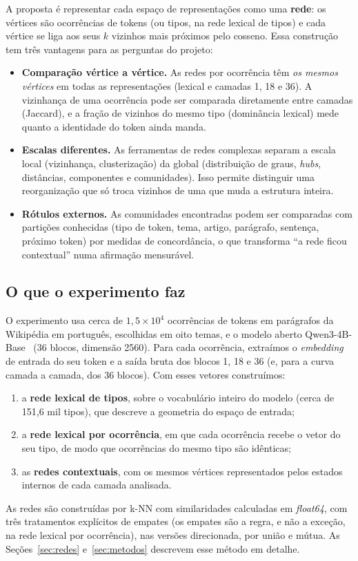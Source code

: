 A proposta é representar cada espaço de representações como uma \textbf{rede}: os vértices são
ocorrências de tokens (ou tipos, na rede lexical de tipos) e cada vértice se liga aos seus $k$
vizinhos mais próximos pelo cosseno. Essa construção tem três vantagens para as perguntas do
projeto:
\begin{itemize}
    \item \textbf{Comparação vértice a vértice.} As redes por ocorrência têm \emph{os mesmos
    vértices} em todas as representações (lexical e camadas 1, 18 e 36). A vizinhança de uma
    ocorrência pode ser comparada diretamente entre camadas (Jaccard), e a fração de vizinhos do
    mesmo tipo (dominância lexical) mede quanto a identidade do token ainda manda.
    \item \textbf{Escalas diferentes.} As ferramentas de redes complexas separam a escala local
    (vizinhança, clusterização) da global (distribuição de graus, \emph{hubs}, distâncias,
    componentes e comunidades). Isso permite distinguir uma reorganização que só troca vizinhos
    de uma que muda a estrutura inteira.
    \item \textbf{Rótulos externos.} As comunidades encontradas podem ser comparadas com
    partições conhecidas (tipo de token, tema, artigo, parágrafo, sentença, próximo token) por
    medidas de concordância, o que transforma ``a rede ficou contextual'' numa afirmação
    mensurável.
\end{itemize}

\subsection{O que o experimento faz}

O experimento usa cerca de $1{,}5\times10^4$ ocorrências de tokens em parágrafos da Wikipédia em
português, escolhidas em oito temas, e o modelo aberto Qwen3-4B-Base~\cite{qwen3} (36 blocos,
dimensão 2560). Para cada ocorrência, extraímos o \emph{embedding} de entrada do seu token e
a saída bruta dos blocos 1, 18 e 36 (e, para a curva camada a camada, dos 36 blocos). Com
esses vetores construímos:
\begin{enumerate}
    \item a \textbf{rede lexical de tipos}, sobre o vocabulário inteiro do modelo (cerca de
    151,6 mil tipos), que descreve a geometria do espaço de entrada;
    \item a \textbf{rede lexical por ocorrência}, em que cada ocorrência recebe o vetor do seu
    tipo, de modo que ocorrências do mesmo tipo são idênticas;
    \item as \textbf{redes contextuais}, com os mesmos vértices representados pelos estados
    internos de cada camada analisada.
\end{enumerate}
As redes são construídas por k-NN com similaridades calculadas em \emph{float64}, com três
tratamentos explícitos de empates (os empates são a regra, e não a exceção, na rede lexical
por ocorrência), nas versões direcionada, por união e mútua. As Seções~\ref{sec:redes}
e~\ref{sec:metodos} descrevem esse método em detalhe.

